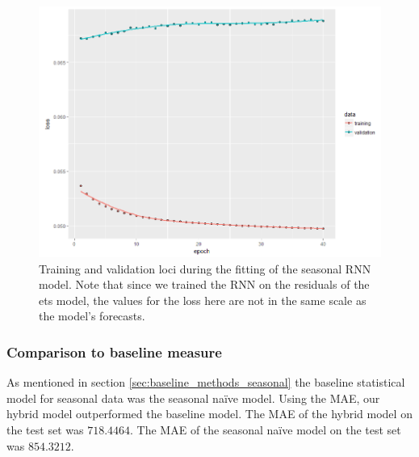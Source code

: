 \documentclass[a4paper,12pt]{article}
\theoremstyle{definition}
\begin{document}
\begin{figure}[ht]
	\centering
	\includegraphics[width=\textwidth]{figures/seasonal_residual_history.png}
	\caption{Training and validation loci during the fitting of the seasonal RNN model. Note that since we trained the RNN on the residuals of the ets model, the values for the loss here are not in the same scale as the model's forecasts.}
	\label{fig:seasonal_residual_history}
\end{figure}

\subsubsection{Comparison to baseline measure}
As mentioned in section \ref{sec:baseline_methods_seasonal} the baseline statistical model for seasonal data was the seasonal na{\"i}ve model. Using the MAE, our hybrid model outperformed the baseline model. The MAE of the hybrid model on the test set was $718.4464$. The MAE of the seasonal na{\"i}ve model on the test set was $854.3212$. 
\end{document}
